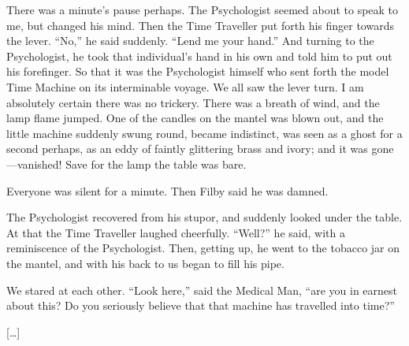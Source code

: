 \documentclass[../book]{subfiles}
\begin{document}
\begin{markdown}
There was a minute’s pause perhaps. The Psychologist seemed about to speak to me, but changed his mind. Then the Time Traveller put forth his finger towards the lever. “No,” he said suddenly. “Lend me your hand.” And turning to the Psychologist, he took that individual’s hand in his own and told him to put out his forefinger. So that it was the Psychologist himself who sent forth the model Time Machine on its interminable voyage. We all saw the lever turn. I am absolutely certain there was no trickery. There was a breath of wind, and the lamp flame jumped. One of the candles on the mantel was blown out, and the little machine suddenly swung round, became indistinct, was seen as a ghost for a second perhaps, as an eddy of faintly glittering brass and ivory; and it was gone—vanished! Save for the lamp the table was bare.

Everyone was silent for a minute. Then Filby said he was damned.

The Psychologist recovered from his stupor, and suddenly looked under the table. At that the Time Traveller laughed cheerfully. “Well?” he said, with a reminiscence of the Psychologist. Then, getting up, he went to the tobacco jar on the mantel, and with his back to us began to fill his pipe.

We stared at each other. “Look here,” said the Medical Man, “are you in earnest about this? Do you seriously believe that that machine has travelled into time?”

[…]

\end{markdown}
\end{document}
